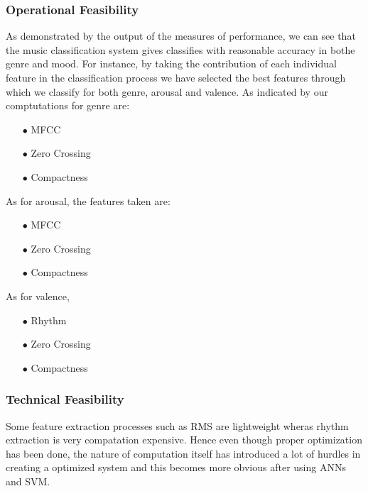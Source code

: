 \subsubsection{Operational Feasibility}
    As demonstrated by the output of the measures of performance, we can see that the music classification system gives classifies with reasonable accuracy in bothe genre and mood. For instance, by taking the contribution of each
    individual feature in the classification process we have selected the best features through which we classify for both genre, arousal and valence. As indicated by our comptutations for genre are:
    \begin{itemize}
    \item[$\bullet$] MFCC
    \item[$\bullet$] Zero Crossing
    \item[$\bullet$] Compactness
    \end{itemize}
    As for arousal, the features taken are:
    \begin{itemize}
    \item[$\bullet$] MFCC
    \item[$\bullet$] Zero Crossing
    \item[$\bullet$] Compactness
    \end{itemize}
    As for valence,
    \begin{itemize}
    \item[$\bullet$] Rhythm
    \item[$\bullet$] Zero Crossing
    \item[$\bullet$] Compactness
    \end{itemize}
\newpage
\subsubsection{Technical Feasibility}
    Some feature extraction processes such as RMS are lightweight wheras rhythm extraction is very compatation expensive. Hence even though proper optimization has been done, the nature of computation itself has introduced a lot of
    hurdles in creating a optimized system and this becomes more obvious after using ANNs and SVM.
